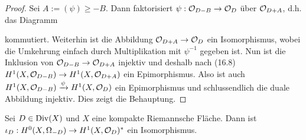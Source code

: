 \begin{proof}
  Sei $A := (\psi) \geq -B$. Dann faktorisiert $\psi: \mathcal{O}_{D-B} \rightarrow
  \mathcal{O}_D$ über $\mathcal{O}_{D+A}$, d.h. das Diagramm
  \begin{center}
  \end{center}
  kommutiert. Weiterhin ist die Abbildung $\mathcal{O}_{D+A} \rightarrow \mathcal{O}_D$ ein
  Isomorphismus, wobei die Umkehrung einfach durch Multiplikation mit
  $\psi^{-1}$ gegeben ist. Nun ist die Inklusion von $\mathcal{O}_{D-B} \rightarrow
  \mathcal{O}_{D+A}$ injektiv und deshalb nach (16.8) $H^1(X, \mathcal{O}_{D-B}) \rightarrow
  H^1(X, \mathcal{O}_{D+A})$ ein Epimorphismus. Also ist auch $H^1(X,
  \mathcal{O}_{D-B}) \xrightarrow{\psi} H^1(X, \mathcal{O}_D)$ ein Epimorphismus und
  schlussendlich die duale Abbildung injektiv. Dies zeigt die Behauptung.
\end{proof}

\begin{thm}
  \label{thm:serre}
  Sei $D \in \operatorname{Div}(X)$ und $X$ eine kompakte Riemannsche Fläche. Dann
  ist $\iota_D: H^0(X, \Omega_{-D}) \rightarrow H^1(X, \mathcal{O}_D)^\ast$ ein Isomorphismus.
\end{thm}

